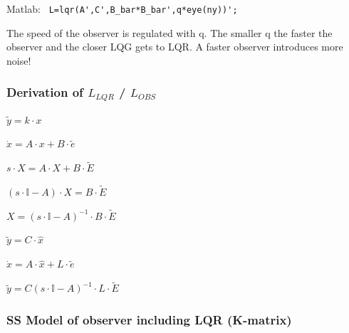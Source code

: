 \documentclass[10pt,a4paper]{scrartcl}
\begin{document}
\begin{multicols*}{3}
	
	
	
	
	Matlab: \verb+ L=lqr(A',C',B_bar*B_bar',q*eye(ny))';+
	
	\finn
	
	The speed of the observer is regulated with q. The smaller q the faster the observer and the closer LQG gets to LQR. A faster observer introduces more noise!
	
	
	\subsubsection*{Derivation of $L_{LQR}$ / $L_{OBS}$}
	
	
	\begin{multicols*}{2}
	$\tilde{y}=k\cdot x$
	
	$\dot{x}=A\cdot x+B\cdot \tilde{e}$
	
	$s\cdot X=A\cdot X+B\cdot\tilde{E}$
	
	$(s\cdot\mathbb{I}-A)\cdot X=B\cdot\tilde{E}$
	
	$X=(s\cdot\mathbb{I}-A)^{-1}\cdot B\cdot\tilde{E}$
	
	
	\columnbreak
	
	$\tilde{y}=C\cdot \hat{x}$
	
	$\hat{\dot{x}}=A\cdot\hat{x}+L\cdot\tilde{e}$
	
	$\tilde{y}=C(s\cdot\mathbb{I}-A)^{-1}\cdot L\cdot\tilde{E}$
	
	
	\end{multicols*}
	
	\subsubsection*{SS Model of observer including LQR (K-matrix)}
	

\end{multicols*}
\end{document}
